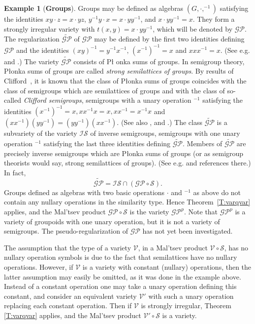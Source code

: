 \documentclass{birkau}
\newcommand{\mc}{\mathcal}
\newcommand{\mcV}{\mathcal{V}}
\newcommand{\mcS}{\mathcal{S}}
\def\wt{\widetilde}
\newcommand{\pro}[1]{{#1}^p}
\theoremstyle{plain}
\theoremstyle{definition}
\newtheorem{example}[theorem]{Example}
\numberwithin{equation}{section}
\begin{document}
\begin{example}[\textbf{Groups}]
  Groups may be defined as algebras $(G, \cdot, ^{-1})$ satisfying the identities
  $xy \cdot z = x \cdot yz$, $y^{-1}y \cdot x = x \cdot y y^{-1}$, and
  $x \cdot y y^{-1} = x$. They form a strongly irregular variety with
  $t(x,y) = x \cdot y y^{-1}$, which will be denoted by $\mc{GP}$. The regularization
  $\wt{\mc{GP}}$ of $\mc{GP}$ may be defined by the first two identities defining $\mc{GP}$ and
  the identities $(xy)^{-1} = y^{-1} x^{-1}, \, (x^{-1})^{-1} = x$ and $xxx^{-1} =
  x$. (See e.g. \cite{P69} and \cite{PR92}.) The variety $\wt{\mc{GP}}$ consists of P\l
  onka sums of groups. In semigroup theory, P\l onka sums of groups are called
  \emph{strong semilattices of groups}. By results of Clifford~\cite{C41}, it is known
  that the class of P\l onka sums of groups coincides with the class of semigroups which
  are semilattices of groups and with the class of so-called \emph{Clifford semigroups},
  semigroups with a unary operation $^{-1}$ satisfying the identities
  $(x^{-1})^{-1} = x, xx^{-1}x = x, x x^{-1} = x^{-1} x$ and
  $(x x^{-1}) (y y^{-1}) = (y y^{-1}) (x x^{-1})$.  (See also \cite{CP61}, \cite{H76} and
  \cite{H95}.)  The class $\wt{\mc{GP}}$ is a subvariety of the variety $\mc{IS}$ of
  inverse semigroups, semigroups with one unary operation $^{-1}$ satisfying the last
  three identities defining $\wt{\mc{GP}}$. Members of $\wt{\mc{GP}}$ are precisely inverse
  semigroups which are P\l onka sums of groups (or as semigroup theorists would say,
  strong semilattices of groups). (See e.g. \cite{PR92} and references there.) In fact,
  \begin{equation*}
\wt{\mc{GP}} = \mc{IS} \cap (\mc{GP} \circ \mcS).
\end{equation*}
Groups defined as algebras with two basic operations $\cdot$ and $^{-1}$ as above do not
contain any nullary operations in the similarity type. Hence Theorem~\ref{T:varqvar} applies, and the
Mal'tsev product $\mc{GP} \circ \mcS$ is the variety $\pro{\mc{GP}}$. Note that
$\pro{\mc{GP}}$ is a variety of groupoids with one unary operation, but it is not a variety
of semigroups. The pseudo-regularization of $\mc{GP}$ has not yet been investigated.
\end{example}

The assumption that the type of a variety $\mcV$, in a Mal'tsev product $\mcV \circ \mcS$,
has no nullary operation symbols is due to the fact that semilattices have no nullary
operations. However, if $\mcV$ is a variety with constant (nullary) operations, then the
latter assumption may easily be omitted, as it was done in the example above. Instead of a
constant operation one may take a unary operation defining this constant, and consider an
equivalent variety $\mcV'$ with such a unary operation replacing each constant
operation. Then if $\mcV$ is strongly irregular, Theorem \ref{T:varqvar} applies, and the
Mal'tsev product $\mc{V'} \circ \mcS$ is a variety.
\end{document}
